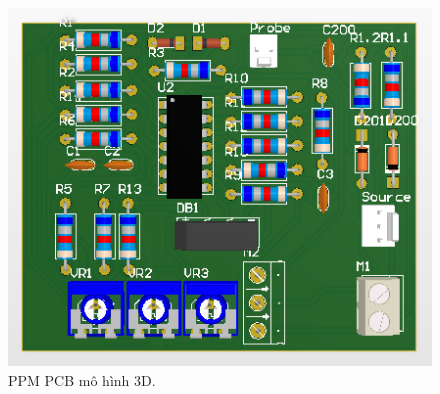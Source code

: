 \documentclass[a4paper,12pt,oneside]{article}
\begin{document}
\begin{enumerate}
\begin{figure}[H]
\centering
\includegraphics[scale=.7]{hinh/PPM/ppm_3d.PNG}
\caption{PPM PCB mô hình 3D.}
\end{figure}


\end{enumerate}
\end{document}
